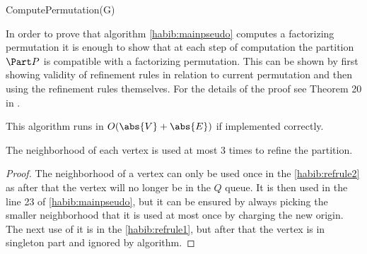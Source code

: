 \begin{function}
    \caption{ComputePermutation(G)}
    \label{habib:mainpseudo}
    \DontPrintSemicolon

\end{function}

In order to prove that algorithm \ref{habib:mainpseudo} computes a factorizing permutation it is enough to show that at each step of computation the partition $\Part P$ is compatible with a factorizing permutation. This can be shown by first showing validity of refinement rules in relation to current permutation and then using the refinement rules themselves. For the details of the proof see Theorem 20 in \cite{habib}.

This algorithm runs in $O(\abs{V} + \abs{E})$ if implemented correctly.

\begin{lemma}\label{habib:complexity}
    The neighborhood of each vertex is used at most 3 times to refine the partition.
\end{lemma}
\begin{proof}
    The neighborhood of a vertex can only be used once in the \ref{habib:refrule2} as after that the vertex will no longer be in the $Q$ queue. It is then used in the line 23 of \ref{habib:mainpseudo}, but it can be ensured by always picking the smaller neighborhood that it is used at most once by charging the new origin. The next use of it is in the \ref{habib:refrule1}, but after that the vertex is in singleton part and ignored by algorithm.
\end{proof}

